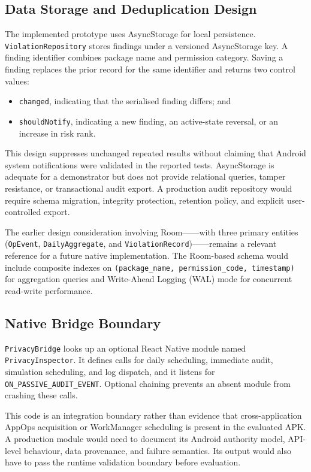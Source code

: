 \subsection{Data Storage and Deduplication Design}

The implemented prototype uses AsyncStorage for local persistence. \texttt{ViolationRepository} stores findings under a versioned AsyncStorage key. A finding identifier combines package name and permission category. Saving a finding replaces the prior record for the same identifier and returns two control values:

\begin{itemize}
    \item \texttt{changed}, indicating that the serialised finding differs; and
    \item \texttt{shouldNotify}, indicating a new finding, an active-state reversal, or an increase in risk rank.
\end{itemize}

This design suppresses unchanged repeated results without claiming that Android system notifications were validated in the reported tests. AsyncStorage is adequate for a demonstrator but does not provide relational queries, tamper resistance, or transactional audit export. A production audit repository would require schema migration, integrity protection, retention policy, and explicit user-controlled export.

The earlier design consideration involving Room——with three primary entities (\texttt{OpEvent}, \texttt{DailyAggregate}, and \texttt{ViolationRecord})——remains a relevant reference for a future native implementation. The Room-based schema would include composite indexes on \texttt{(package\_name, permission\_code, timestamp)} for aggregation queries and Write-Ahead Logging (WAL) mode for concurrent read-write performance.

\subsection{Native Bridge Boundary}

\texttt{PrivacyBridge} looks up an optional React Native module named \texttt{PrivacyInspector}. It defines calls for daily scheduling, immediate audit, simulation scheduling, and log dispatch, and it listens for \texttt{ON\_PASSIVE\_AUDIT\_EVENT}. Optional chaining prevents an absent module from crashing these calls.

This code is an integration boundary rather than evidence that cross-application AppOps acquisition or WorkManager scheduling is present in the evaluated APK. A production module would need to document its Android authority model, API-level behaviour, data provenance, and failure semantics. Its output would also have to pass the runtime validation boundary before evaluation.

